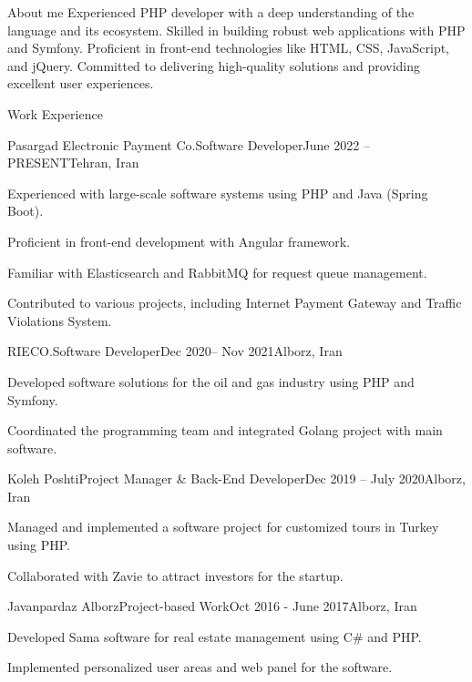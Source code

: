 \documentclass[]{kyvernitis-resume}
\begin{document}
\resumeheader
{}
{}
{}
{}
{\address{Karaj, Alborz Province, Iran}}
{}

\begin{section}{About me}
Experienced PHP developer with a deep understanding of the language and its ecosystem. Skilled in building robust web applications with PHP and Symfony. Proficient in front-end technologies like HTML, CSS, JavaScript, and jQuery. Committed to delivering high-quality solutions and providing excellent user experiences.
\end{section}

\begin{section}{Work Experience}
\begin{subsection}{Pasargad Electronic Payment Co.}{Software Developer}{June 2022 -- PRESENT}{Tehran, Iran}
\item Experienced with large-scale software systems using PHP and Java (Spring Boot).
\item Proficient in front-end development with Angular framework.
\item Familiar with Elasticsearch and RabbitMQ for request queue management.
\item Contributed to various projects, including Internet Payment Gateway and Traffic Violations System.
\end{subsection}

\begin{subsection}{RIECO.}{Software Developer}{Dec 2020-- Nov 2021}{Alborz, Iran}
   	\item Developed software solutions for the oil and gas industry using PHP and Symfony.
\item Coordinated the programming team and integrated Golang project with main software.
\end{subsection}

\begin{subsection}{Koleh Poshti}{Project Manager \& Back-End Developer}{Dec 2019 -- July 2020}{Alborz, Iran}
\item Managed and implemented a software project for customized tours in Turkey using PHP.
\item Collaborated with Zavie to attract investors for the startup.
\end{subsection}

\begin{subsection}{Javanpardaz Alborz}{Project-based Work}{Oct 2016 - June 2017}{Alborz, Iran}
\item Developed Sama software for real estate management using C\# and PHP.
\item Implemented personalized user areas and web panel for the software.
\end{subsection}



\end{section}
\end{document}
